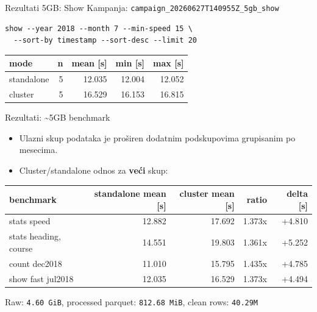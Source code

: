 \documentclass[aspectratio=169,11pt]{beamer}
\newcommand{\code}[1]{\texttt{\small #1}}
\begin{document}
\begin{frame}[fragile]{Rezultati 5GB: Show}
  Kampanja: \code{campaign\_20260627T140955Z\_5gb\_show}

  \scriptsize
  \begin{verbatim}
show --year 2018 --month 7 --min-speed 15 \
  --sort-by timestamp --sort-desc --limit 20
  \end{verbatim}
  \normalsize

  \begin{tabular}{lrrrr}
    \toprule
    mode & n & mean [s] & min [s] & max [s] \\
    \midrule
    standalone & 5 & 12.035 & 12.004 & 12.052 \\
    cluster & 5 & 16.529 & 16.153 & 16.815 \\
    \bottomrule
  \end{tabular}
\end{frame}

\begin{frame}{Rezultati: \textasciitilde 5GB benchmark}
  \begin{itemize}
    \item Ulazni skup podataka je proširen dodatnim podskupovima grupisanim po mesecima.
    \item Cluster/standalone odnos za \textbf{veći} skup:
  \end{itemize}

  \vspace{0.5cm}
  \scriptsize
  \begin{tabular}{lrrrr}
    \toprule
    benchmark & standalone mean [s] & cluster mean [s] & ratio & delta [s] \\
    \midrule
    stats speed & 12.882 & 17.692 & 1.373x & +4.810 \\
    stats heading, course & 14.551 & 19.803 & 1.361x & +5.252 \\
    count dec2018 & 11.010 & 15.795 & 1.435x & +4.785 \\
    show fast jul2018 & 12.035 & 16.529 & 1.373x & +4.494 \\
    \bottomrule
  \end{tabular}
  \normalsize

  \vspace{0.3cm}
  Raw: \code{4.60 GiB}, processed parquet: \code{812.68 MiB}, clean rows: \code{40.29M}
\end{frame}
\end{document}
